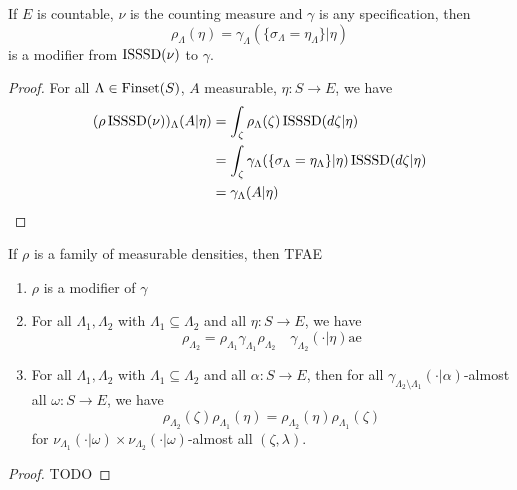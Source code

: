 \begin{lemma}
    \label{lem:exists-modif-countable}

    If $E$ is countable, $\nu$ is the counting measure and $\gamma$ is any specification, then
    $$\rho_\Lambda(\eta) = \gamma_\Lambda(\{\sigma_\Lambda = \eta_\Lambda\} | \eta)$$
    is a modifier from $\operatorname{ISSSD}(\nu)$ to $\gamma$.
\end{lemma}
\begin{proof}

    For all $\Lambda \in \operatorname{Finset}(S)$, $A$ measurable, $\eta : S \to E$, we have
    \begin{align}
        (\rho\operatorname{ISSSD}(\nu))_\Lambda(A|\eta)
        & = \int_\zeta \rho_\Lambda(\zeta) \operatorname{ISSSD}(d\zeta|\eta) \\
        & = \int_\zeta \gamma_\Lambda(\{\sigma_\Lambda = \eta_\Lambda\} | \eta) \operatorname{ISSSD}(d\zeta|\eta) \\
        & = \gamma_\Lambda(A|\eta)
    \end{align}
\end{proof}

\begin{proposition}
    \label{prop:modif-tfae}

    If $\rho$ is a family of measurable densities, then TFAE
    \begin{enumerate}
        \item $\rho$ is a modifier of $\gamma$
        \item For all $\Lambda_1, \Lambda_2$ with $\Lambda_1 \subseteq \Lambda_2$ and all $\eta : S \to E$, we have
        $$\rho_{\Lambda_2} = \rho_{\Lambda_1} \gamma_{\Lambda_1} \rho_{\Lambda_2} \quad \gamma_{\Lambda_2}(\cdot|\eta)\text{ae}$$
        \item For all $\Lambda_1, \Lambda_2$ with $\Lambda_1 \subseteq \Lambda_2$ and all $\alpha : S \to E$, then for all $\gamma_{\Lambda_2 \setminus \Lambda_1}(\cdot|\alpha)$-almost all $\omega : S \to E$, we have
        $$\rho_{\Lambda_2}(\zeta)\rho_{\Lambda_1}(\eta) = \rho_{\Lambda_2}(\eta) \rho_{\Lambda_1}(\zeta)$$
        for $\nu_{\Lambda_1}(\cdot|\omega) \times \nu_{\Lambda_2}(\cdot|\omega)$-almost all $(\zeta, \lambda)$.
    \end{enumerate}
\end{proposition}
\begin{proof}

    TODO
\end{proof}


